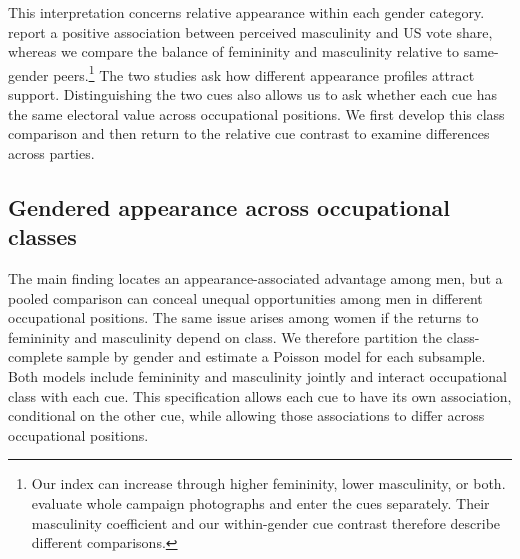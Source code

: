 \documentclass[11pt,a4paper]{article}\usepackage[]{graphicx}\usepackage[]{xcolor}
\begin{document}
This interpretation concerns relative appearance within each gender category. \textcite{Park2023} report a positive association between perceived masculinity and US vote share, whereas we compare the balance of femininity and masculinity relative to same-gender peers.\footnote{Our index can increase through higher femininity, lower masculinity, or both. \textcite{Park2023} evaluate whole campaign photographs and enter the cues separately. Their masculinity coefficient and our within-gender cue contrast therefore describe different comparisons.} The two studies ask how different appearance profiles attract support. Distinguishing the two cues also allows us to ask whether each cue has the same electoral value across occupational positions. We first develop this class comparison and then return to the relative cue contrast to examine differences across parties.

\subsection{Gendered appearance across occupational classes}
\label{sec:class-results}
The main finding locates an appearance-associated advantage among men, but a pooled comparison can conceal unequal opportunities among men in different occupational positions. The same issue arises among women if the returns to femininity and masculinity depend on class. We therefore partition the class-complete sample by gender and estimate a Poisson model for each subsample. Both models include femininity and masculinity jointly and interact occupational class with each cue. This specification allows each cue to have its own association, conditional on the other cue, while allowing those associations to differ across occupational positions.
\end{document}
